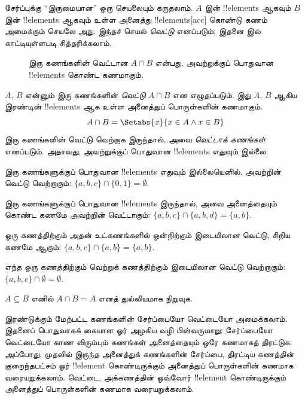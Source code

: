 \documentclass[../../../include/open-logic-section]{subfiles}
\begin{document}
\begin{explain}
சேர்ப்புக்கு ``இருமையான'' ஒரு செயலையும் கருதலாம்.
$A$ இன் !!{element}s ஆகவும் $B$ இன் !!{element}s ஆகவும் உள்ள
அனைத்து !!{element}s[acc] கொண்டு கணம் அமைக்கும் செயலே அது.
இந்தச் செயல் \emph{வெட்டு} எனப்படும்;
இதனை  இல் காட்டியுள்ளபடி சித்தரிக்கலாம்.
\begin{figure}
  \caption{இரு கணங்களின் வெட்டான $A \cap B$ என்பது,
  அவற்றுக்குப் பொதுவான !!{element}s கொண்ட கணமாகும்.}
\end{figure}
\end{explain}

\begin{defn}[வெட்டு]
$A$, $B$ என்னும் இரு கணங்களின் \emph{வெட்டு} $A \cap B$ என எழுதப்படும்.
இது $A$, $B$ ஆகிய இரண்டின் !!{element}s ஆக உள்ள அனைத்துப் பொருள்களின் கணமாகும்.
\[
A \cap B = \Setabs{x}{x \in A \land x \in B}
\]
இரு கணங்களின் வெட்டு வெற்றாக இருந்தால், அவை \emph{வெட்டாக் கணங்கள்} எனப்படும்.
அதாவது, அவற்றுக்குப் பொதுவான !!{element}s எதுவும் இல்லை.
\end{defn}

\begin{ex}
இரு கணங்களுக்குப் பொதுவான !!{element}s எதுவும் இல்லையெனில்,
அவற்றின் வெட்டு வெற்றாகும்:
$\{ a, b, c\} \cap \{ 0, 1\} = \emptyset$.

இரு கணங்களுக்குப் பொதுவான !!{element}s இருந்தால்,
அவை அனைத்தையும் கொண்ட கணமே அவற்றின் வெட்டாகும்:
$\{a, b, c \} \cap \{a, b, d \} = \{a, b\}$.

ஒரு கணத்திற்கும் அதன் உட்கணங்களில் ஒன்றிற்கும் இடையிலான வெட்டு,
சிறிய கணமே ஆகும்:
$\{a, b, c\} \cap \{a, b\} = \{a, b\}$.

எந்த ஒரு கணத்திற்கும் வெற்றுக் கணத்திற்கும் இடையிலான வெட்டு வெற்றாகும்:
$\{a, b, c \} \cap \emptyset = \emptyset$.
\end{ex}

\begin{prob}
$A \subseteq B$ எனில் $A \cap B = A$ எனத் துல்லியமாக நிறுவுக.
\end{prob}

\begin{explain}
இரண்டுக்கும் மேற்பட்ட கணங்களின் சேர்ப்பையோ வெட்டையோ அமைக்கலாம்.
இதனைப் பொதுவாகக் கையாள ஓர் அழகிய வழி பின்வருமாறு:
சேர்ப்பையோ வெட்டையோ காண விரும்பும் கணங்கள் அனைத்தையும் ஒரே கணமாகத் திரட்டுக.
அப்போது, முதலில் இருந்த அனைத்துக் கணங்களின் சேர்ப்பை,
திரட்டிய கணத்தின் குறைந்தபட்சம் ஓர் !!{element} கொண்டிருக்கும் அனைத்துப்
பொருள்களின் கணமாக வரையறுக்கலாம். வெட்டை, அக்கணத்தின் ஒவ்வோர்
!!{element} கொண்டிருக்கும் அனைத்துப் பொருள்களின் கணமாக வரையறுக்கலாம்.
\end{explain}
\end{document}
